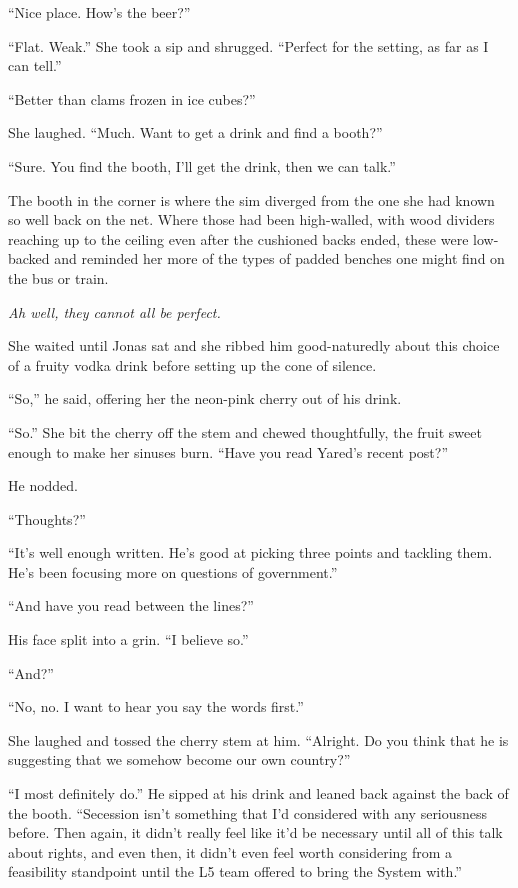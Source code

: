 ``Nice place. How's the beer?''

``Flat. Weak.'' She took a sip and shrugged. ``Perfect for the setting, as far as I can tell.''

``Better than clams frozen in ice cubes?''

She laughed. ``Much. Want to get a drink and find a booth?''

``Sure. You find the booth, I'll get the drink, then we can talk.''

The booth in the corner is where the sim diverged from the one she had known so well back on the net. Where those had been high-walled, with wood dividers reaching up to the ceiling even after the cushioned backs ended, these were low-backed and reminded her more of the types of padded benches one might find on the bus or train.

\emph{Ah well, they cannot all be perfect.}

She waited until Jonas sat and she ribbed him good-naturedly about this choice of a fruity vodka drink before setting up the cone of silence.

``So,'' he said, offering her the neon-pink cherry out of his drink.

``So.'' She bit the cherry off the stem and chewed thoughtfully, the fruit sweet enough to make her sinuses burn. ``Have you read Yared's recent post?''

He nodded.

``Thoughts?''

``It's well enough written. He's good at picking three points and tackling them. He's been focusing more on questions of government.''

``And have you read between the lines?''

His face split into a grin. ``I believe so.''

``And?''

``No, no. I want to hear you say the words first.''

She laughed and tossed the cherry stem at him. ``Alright. Do you think that he is suggesting that we somehow become our own country?''

``I most definitely do.'' He sipped at his drink and leaned back against the back of the booth. ``Secession isn't something that I'd considered with any seriousness before. Then again, it didn't really feel like it'd be necessary until all of this talk about rights, and even then, it didn't even feel worth considering from a feasibility standpoint until the L5 team offered to bring the System with.''

